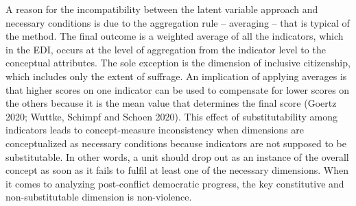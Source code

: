 \documentclass [11pt]{article}
\begin{document}
A reason for the incompatibility between the latent variable approach and necessary conditions is due to the aggregation rule -- averaging -- that is typical of the method. The final outcome is a weighted average of all the indicators, which in the EDI, occurs at the level of aggregation from the indicator level to the conceptual attributes. The sole exception is the dimension of inclusive citizenship, which includes only the extent of suffrage. An implication of applying averages is that higher scores on one indicator can be used to compensate for lower scores on the others because it is the mean value that determines the final score (Goertz 2020; Wuttke, Schimpf and Schoen 2020). This effect of substitutability among indicators leads to concept-measure inconsistency when dimensions are conceptualized as necessary conditions because indicators are not supposed to be substitutable. In other words, a unit should drop out as an instance of the overall concept as soon as it fails to fulfil at least one of the necessary dimensions. When it comes to analyzing post-conflict democratic progress, the key constitutive and non-substitutable dimension is non-violence.
\end{document}

